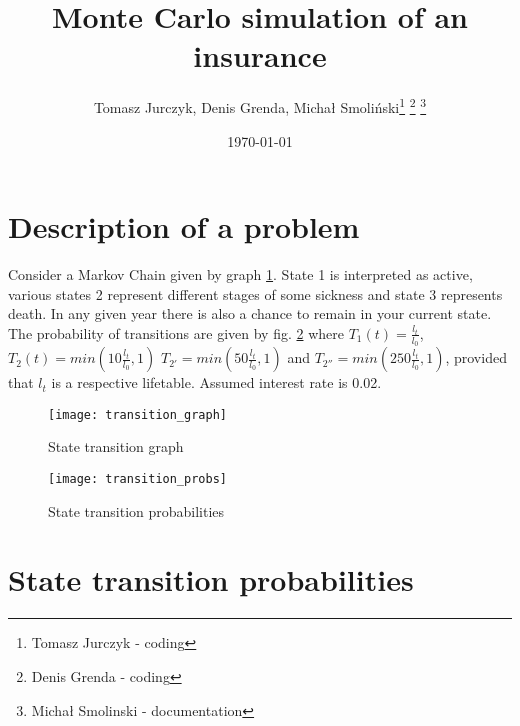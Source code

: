 \documentclass[11pt,wide]{mwart}
\title{Monte Carlo simulation of an insurance}
\date{\today}
\author{Tomasz Jurczyk, Denis Grenda, Michał Smoliński\footnote{Tomasz Jurczyk - coding} \footnote{Denis Grenda - coding} \footnote{Michał Smolinski - documentation} }
\begin{document}
\maketitle

\section{Description of a problem}

Consider a Markov Chain given by graph \ref{transition_graph}. State 1 is interpreted as active, various states 2 represent different stages of some sickness and state 3 represents death. In any given year there is also a chance to remain in your current state.\\
The probability of transitions
are given by fig. \ref{transition_probs}
where $T_1(t) = \frac{l_t}{l_0}$, $T_2(t) = min(10 \frac{l_t}{l_0}, 1)$ $T_{2'} =min(50 \frac{l_t}{l_0}, 1)$ and $T_{2''} = min(250 \frac{l_t}{l_0}, 1)$, provided that $l_t$ is a respective lifetable. Assumed interest rate is 0.02.
\begin{figure}[!htbp]
	\caption{State transition graph}
	\label{transition_graph}
	\texttt{[image: transition\_graph]}
	\centering
\end{figure}

\begin{figure}[!htbp]
	\caption{State transition probabilities}
	\label{transition_probs}
	\texttt{[image: transition\_probs]}
	\centering
\end{figure}

\newpage

\section{State transition probabilities}
\end{document}

